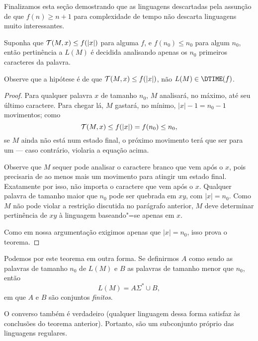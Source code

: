 Finalizamos esta seção demostrando que
as linguagens descartadas pela assunção de que
$f(n) \geq n+1$ para complexidade de tempo
não descarta linguagens muito interessantes.

\begin{proposition}
    Suponha que ${\mathcal{T}}(M, x) \leq f(|x|)$ para alguma $f$,
    e $f(n_0) \leq n_0$ para algum $n_0$,
    então pertinência a $L(M)$
    é decidida analisando apenas os $n_0$ primeiros caracteres da palavra.
    \label{thm:sublinear_time_regular}
\end{proposition}

Observe que a hipótese é de que
${\mathcal{T}}(M, x) \leq f(|x|)$,
não
$L(M) \in \DTIME(f)$.

\begin{proof}
    Para qualquer palavra $x$ de tamanho $n_0$,
    $M$ analisará,
    no máximo,
    até seu último caractere.
    Para chegar lá, $M$ gastará,
    no mínimo,
    $|x| - 1 = n_0 - 1$ movimentos;
    como
    \begin{equation*}
        {\mathcal{T}}(M, x) \leq f(|x|) = f(n_0) \leq n_0,
    \end{equation*}
    se $M$ ainda não está num estado final,
    o próximo movimento terá que ser para um
    --- caso contrário,
    violaria a equação acima.

    Observe que $M$ sequer pode analisar o caractere branco
    que vem após o $x$,
    pois precisaria de ao menos mais um movimento
    para atingir um estado final.
    Exatamente por isso, não importa o caractere que vem após o $x$.
    Qualquer palavra de tamanho maior que $n_0$
    pode ser quebrada em $xy$, com $|x| = n_0$.
    Como $M$ não pode violar a restrição discutida no parágrafo anterior,
    $M$ deve determinar pertinência de $xy$ à linguagem
    baseando"=se apenas em $x$.

    Como em nossa argumentação
    exigimos apenas que $|x| = n_0$,
    isso prova o teorema.
\end{proof}

Podemos por este teorema em outra forma.
Se definirmos $A$ como sendo as palavras de tamanho $n_0$
de $L(M)$
e $B$ as palavras de tamanho menor que $n_0$,
então
\begin{equation*}
    L(M) = A\Sigma^* \cup B,
\end{equation*}
em que $A$ e $B$ são conjuntos \emph{finitos}.

O converso também é verdadeiro
(qualquer linguagem dessa forma
satisfaz às conclusões do teorema anterior).
Portanto, são um subconjunto próprio
das linguagens regulares.
